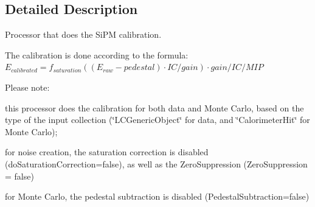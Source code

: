 \subsection{Detailed Description}
Processor that does the Si\-P\-M calibration. 

The calibration is done according to the formula\-: $E_{calibrated}=f_{saturation}((E_{raw}-pedestal) \cdot IC/gain) \cdot gain/IC/MIP$

Please note\-:
\begin{DoxyItemize}
\item this processor does the calibration for both data and Monte Carlo, based on the type of the input collection (\char`\"{}\-L\-C\-Generic\-Object\char`\"{} for data, and \char`\"{}\-Calorimeter\-Hit\char`\"{} for Monte Carlo);
\item for noise creation, the saturation correction is disabled (do\-Saturation\-Correction=false), as well as the Zero\-Suppression (Zero\-Suppression = false)
\item for Monte Carlo, the pedestal subtraction is disabled (Pedestal\-Subtraction=false)
\end{DoxyItemize}

